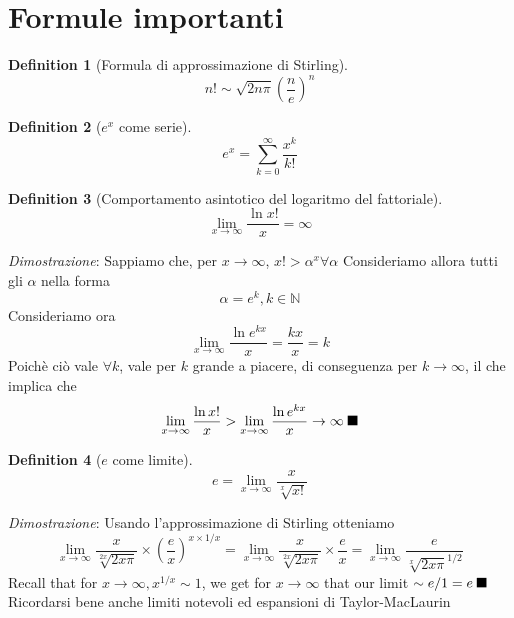 \documentclass{article}
\newtheorem{definition}{Definition}[section]
\newcommand{\qed}{\rule{0.7em}{0.7em}}
\begin{document}
\section{Formule importanti}
    \begin{definition}[Formula di approssimazione di Stirling]
        $$n! \sim \sqrt{2n\pi}\left(\frac{n}{e}\right)^n$$
    \end{definition}
    \begin{definition}[$e^x$ come serie]
        $$e^x = \sum_{k=0}^\infty \frac{x^k}{k!}$$
    \end{definition}
    \begin{definition}[Comportamento asintotico del logaritmo del fattoriale]
        $$\lim_{x \to \infty}\frac{\ln{x!}}{x} = \infty$$
    \end{definition}
    \textit{Dimostrazione}:
        Sappiamo che, per $x \to \infty$, $x! > \alpha^x \forall \alpha$ Consideriamo allora 
        tutti gli $\alpha$ nella forma $$\alpha = e^{k}, k \in \mathbb{N}$$
        Consideriamo ora $$\lim_{x \to \infty}\frac{\ln{e^{kx}}}{x} = \frac{kx}{x} = {k}$$
        Poichè ciò vale $\forall k$, vale per $k$ grande a piacere, di conseguenza per $k \to \infty$, 
        il che implica che 
        $$\lim_{x \to \infty}\frac{\ln{x!}}{x} > \lim_{x \to \infty}\frac{\ln{e^{kx}}}{x} \to \infty \; \qed$$
    \begin{definition}[$e$ come limite]
        $$e = \lim_{x \to \infty}\frac{x}{\sqrt[x]{x!}}$$
    \end{definition}
    \textit{Dimostrazione}:
        Usando l'approssimazione di Stirling otteniamo
        $$\lim_{x \to \infty}\frac{x}{\sqrt[2x]{2x\pi}} \times \left(\frac{e}{x}\right)^{x \times 1/x} = 
            \lim_{x \to \infty}\frac{x}{\sqrt[2x]{2x\pi}} \times \frac{e}{x} = 
            \lim_{x \to \infty}\frac{e}{\sqrt[x]{2x\pi}^{1/2}}$$
        Recall that for $x \to \infty, x^{1/x} \sim 1$, we get for $x \to \infty$ that our 
        limit $\sim e/1 = e \; \qed$
    Ricordarsi bene anche limiti notevoli ed espansioni di Taylor-MacLaurin
    
            
\end{document}
